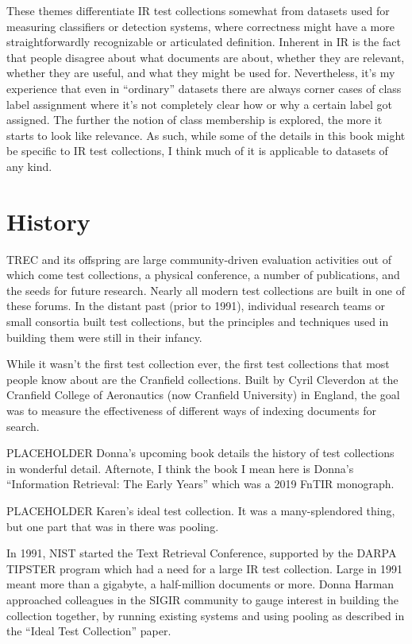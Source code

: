 \documentclass[nobib]{tufte-book}
\begin{document}
These themes differentiate IR test collections somewhat from datasets used for measuring classifiers or detection systems, where correctness might have a more straightforwardly recognizable or articulated definition.  Inherent in IR is the fact that people disagree about what documents are about, whether they are relevant, whether they are useful, and what they might be used for.  Nevertheless, it's my experience that even in ``ordinary'' datasets there are always corner cases of class label assignment where it's not completely clear how or why a certain label got assigned.  The further the notion of class membership is explored, the more it starts to look like relevance.  As such, while some of the details in this book might be specific to IR test collections, I think much of it is applicable to datasets of any kind.

\section{History}

TREC and its offspring are large community-driven evaluation activities out of which come test collections, a physical conference, a number of publications, and the seeds for future research.  Nearly all modern test collections are built in one of these forums.  In the distant past (prior to 1991), individual research teams or small consortia built test collections, but the principles and techniques used in building them were still in their infancy.

While it wasn't the first test collection ever, the first test collections that most people know about are the Cranfield collections.  Built by Cyril Cleverdon at the Cranfield College of Aeronautics (now Cranfield University) in England, the goal was to measure the effectiveness of different ways of indexing documents for search.

PLACEHOLDER Donna's upcoming book details the history of test collections in wonderful detail.  Afternote, I think the book I mean here is Donna's ``Information Retrieval: The Early Years'' which was a 2019 FnTIR monograph.

PLACEHOLDER Karen's ideal test collection.  It was a many-splendored thing, but one part that was in there was pooling.

In 1991, NIST started the Text Retrieval Conference, supported by the DARPA TIPSTER program which had a need for a large IR test collection.\autocite{harman_darpa_1992}  Large in 1991 meant more than a gigabyte, a half-million documents or more.  Donna Harman approached colleagues in the SIGIR community to gauge interest in building the collection together, by running existing systems and using pooling as described in the ``Ideal Test Collection'' paper.
\end{document}

